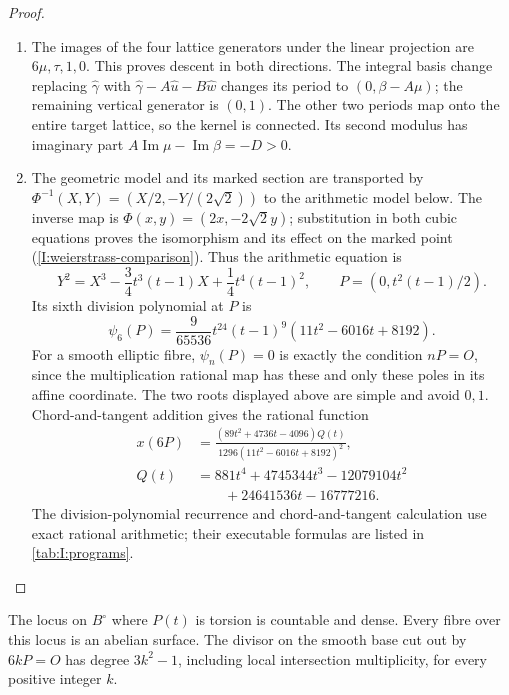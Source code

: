 \begin{proof}
\begin{enumerate}[label=\arabic*.,leftmargin=*]
\item The images of the four lattice generators under the linear projection
are \(6\mu,\tau,1,0\). This proves descent in both directions.
The integral basis change replacing \(\widehat\gamma\) with
\(\widehat\gamma-A\widehat u-B\widehat w\) changes its period to
\((0,\beta-A\mu)\); the remaining vertical generator is \((0,1)\).
The other two periods map onto the entire target lattice, so the kernel
is connected. Its second modulus has imaginary part
\(A\operatorname{Im}\mu-\operatorname{Im}\beta=-D>0\).

\item The geometric model and its marked section are transported by
$\Phi^{-1}(X,Y)=(X/2,-Y/(2\sqrt2))$ to the arithmetic model
below. The inverse map is
$\Phi(x,y)=(2x,-2\sqrt2y)$; substitution in both cubic
equations proves the isomorphism and its effect on the marked point
(\cref{I:weierstrass-comparison}). Thus the arithmetic equation is
\[
 Y^2=X^3-\frac34t^3(t-1)X+\frac14t^4(t-1)^2,
 \qquad P=(0,t^2(t-1)/2).
\]
Its sixth division polynomial at \(P\) is
\[
 \psi_6(P)=\frac9{65536}t^{24}(t-1)^9
 (11t^2-6016t+8192).
\]
For a smooth elliptic fibre, \(\psi_n(P)=0\) is exactly the condition
\(nP=O\), since the multiplication rational map has these and only these
poles in its affine coordinate. The two roots displayed above are simple
and avoid \(0,1\). Chord-and-tangent addition gives the rational function
\[
 \begin{aligned}
 x(6P)&=\frac{(89t^2+4736t-4096)Q(t)}
 {1296(11t^2-6016t+8192)^2},\\
 Q(t)&=881t^4+4745344t^3-12079104t^2\\
 &\hspace{2em}+24641536t-16777216.
 \end{aligned}
\]
The division-polynomial recurrence and chord-and-tangent calculation use
exact rational arithmetic; their executable formulas are listed in
\cref{tab:I:programs}.
\end{enumerate}
\end{proof}

\begin{proposition}\hypertarget{tag-01QS}{}\label{fam:src:D.1.2}\label{fam:st:D.1.2}

The locus on \(B^\circ\) where \(P(t)\) is torsion is countable and dense.
Every fibre over this locus is an abelian surface. The divisor on the
smooth base cut out by \(6kP=O\) has degree \(3k^2-1\), including local
intersection multiplicity, for every positive integer \(k\).
\end{proposition}

